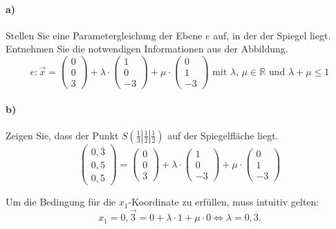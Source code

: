 \documentclass{ajc}
\numberwithin{equation}{subsection}
\begin{document}
	\paragraph{a)} Stellen Sie eine Parametergleichung der Ebene $e$ auf, in der der Spiegel liegt. Entnehmen Sie die notwendigen Informationen aus der Abbildung.
	\begin{equation}
		e: \overrightarrow{x}=\left(\begin{array}{r} 0 \\ 0 \\ 3\end{array}\right) + \lambda \cdot \left(\begin{array}{r} 1 \\ 0 \\ -3\end{array}\right) + \mu \cdot \left(\begin{array}{r} 0 \\ 1 \\ -3\end{array}\right) \text{ mit } \lambda,\,\mu \in \mathbb{R} \text{ und } \lambda + \mu \leq 1
	\end{equation}
	
	\paragraph{b)} Zeigen Sie, dass der Punkt $S(\frac{1}{3}|\frac{1}{2}|\frac{1}{2})$ auf der Spiegelfläche liegt.
	\begin{equation}
		\left(\begin{array}{r} 0,\overline{3} \\ 0,5 \\ 0,5\end{array}\right) = \left(\begin{array}{r} 0 \\ 0 \\ 3\end{array}\right) + \lambda \cdot \left(\begin{array}{r} 1 \\ 0 \\ -3\end{array}\right) + \mu \cdot \left(\begin{array}{r} 0 \\ 1 \\ -3\end{array}\right)
	\end{equation}
	
	Um die Bedingung für die $x_1$-Koordinate zu erfüllen, muss intuitiv gelten:
	\begin{equation}
		x_1 = 0,\overrightarrow{3} = 0 + \lambda \cdot 1 + \mu \cdot 0 \Leftrightarrow \lambda = 0,\overline{3}.
	\end{equation}
	
\end{document}
